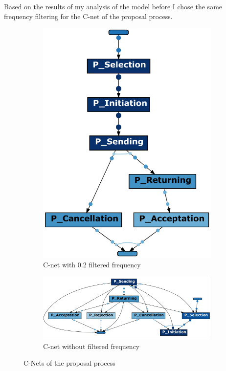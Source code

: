 Based on the results of my analysis of the model before I chose the same frequency filtering for the C-net of the proposal process.
\begin{figure}[!htbp]
\centering
\begin{subfigure}{0.3\textwidth}
\includegraphics[height = 0.2\textheight]{PCnet0-2.PNG}
\caption{C-net with 0.2 filtered frequency}
\label{fig:cnetP0-2}
\end{subfigure}
\begin{subfigure}{0.7\textwidth}
\includegraphics[height = 0.2\textheight]{PropC-Net0.PNG}
\caption{C-net without filtered frequency}
\label{fig:cnetP0}
\end{subfigure}
\caption{C-Nets of the proposal process}
\label{fig:cNetP}
\end{figure}

